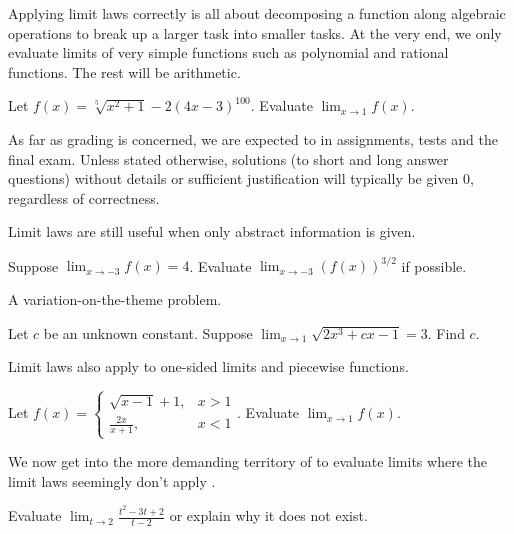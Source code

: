 \documentclass[../main.tex]{subfiles}
\begin{document}
  \clearpage

  Applying limit laws correctly is all about decomposing a function along algebraic operations to break up a larger task into smaller tasks. At the very end, we only evaluate limits of very simple functions such as polynomial and rational functions. The rest will be arithmetic.
  \begin{example}
    Let \(f(x) = \sqrt[5]{x^{2} + 1} - 2 (4x - 3)^{100}\). Evaluate \(\lim_{x \to 1} f(x)\).
  \end{example}
  \faExclamationTriangle{} As far as grading is concerned, we are expected to  in assignments, tests and the final exam.  Unless stated otherwise, solutions (to short and long answer questions) without details or sufficient justification will typically be given \(0\), regardless of correctness. 
  \clearpage

  Limit laws are still useful when only abstract information is given.
  \begin{example}
    Suppose \(\lim_{x \to -3} f(x) = 4\). Evaluate \(\lim_{x \to -3} \left( f(x) \right)^{3/2}\) if possible.
  \end{example}

  A variation-on-the-theme problem.  
  \begin{example}
    Let \(c\) be an unknown constant. Suppose \(\lim_{x \to 1} \sqrt{2x^{3} + cx - 1} = 3\). Find \(c\).
  \end{example}

  \faLightbulb{} Limit laws also apply to one-sided limits and piecewise functions.
  \begin{example}
    Let \(f(x) = \begin{cases}\sqrt{x - 1} + 1, &x > 1\\[1ex]\frac{2x}{x + 1}, &x < 1\end{cases}\). Evaluate \(\lim_{x \to 1} f(x)\).
  \end{example}

  We now get into the more demanding territory of  to evaluate limits where the limit laws seemingly don't apply .

  \begin{example} \label{ex:limit-cancellation}
    Evaluate \(\lim_{t \to 2} \frac{t^{2} - 3t + 2}{t - 2}\) or explain why it does not exist.
  \end{example}
\end{document}
